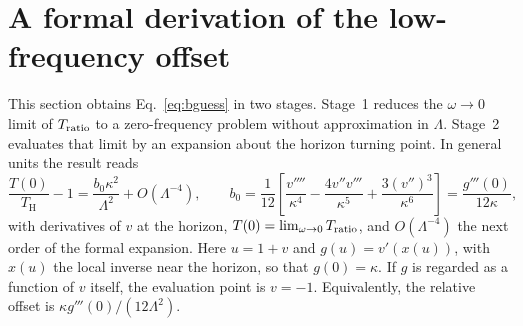 \documentclass[10pt,a4paper]{article}
\newcommand{\HawkingT}{T_{\mathrm H}}
\begin{document}
\clearpage
\section{A formal derivation of the low-frequency offset}
\label{sec:b0}
This section obtains Eq.~\eqref{eq:bguess} in two stages. Stage~1 reduces
the $\omega\to0$ limit of $T_{\rm ratio}$ to a zero-frequency problem without
approximation in $\Lambda$. Stage~2 evaluates that limit by an expansion
about the horizon turning point. In general units the result reads
\begin{equation}
 \frac{T(0)}{\HawkingT}-1=\frac{b_0\kappa^2}{\Lambda^2}+O(\Lambda^{-4}),
 \qquad
 b_0=\frac{1}{12}\left[\frac{v''''}{\kappa^4}-\frac{4v''v'''}{\kappa^5}
 +\frac{3(v'')^3}{\kappa^6}\right]=\frac{g'''(0)}{12\kappa},
 \label{eq:b0}
\end{equation}
with derivatives of $v$ at the horizon, $T(0)=\lim_{\omega\to0}T_{\rm ratio}$,
and $O(\Lambda^{-4})$ the next order of the formal expansion. Here
$u=1+v$ and $g(u)=v'(x(u))$, with $x(u)$ the local inverse near the horizon,
so that $g(0)=\kappa$. If $g$ is regarded as a function of $v$ itself, the
evaluation point is $v=-1$. Equivalently, the relative offset is
$\kappa g'''(0)/(12\Lambda^2)$.
\end{document}
